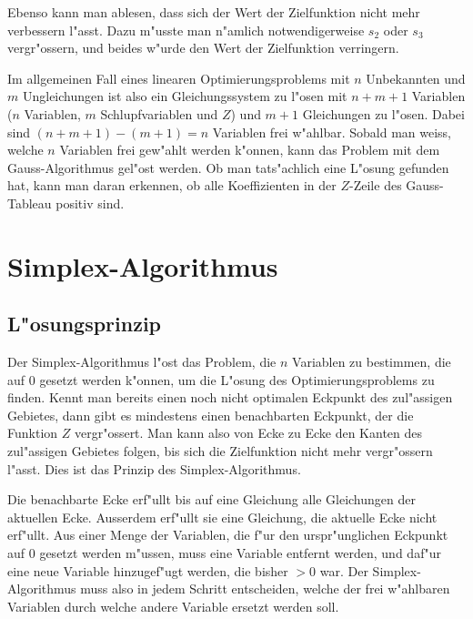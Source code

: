 Ebenso kann man ablesen, dass sich der Wert der Zielfunktion
nicht mehr verbessern l"asst.
Dazu m"usste man n"amlich notwendigerweise $s_2$ oder $s_3$
vergr"ossern, und beides w"urde den Wert der Zielfunktion verringern.

Im allgemeinen Fall eines linearen Optimierungsproblems mit $n$
Unbekannten und $m$ Ungleichungen ist also ein Gleichungssystem
zu l"osen mit $n+m+1$ Variablen ($n$ Variablen, $m$ Schlupfvariablen und
$Z$) und $m+1$ Gleichungen zu l"osen.
Dabei sind $(n+m+1)-(m+1)=n$ Variablen frei w"ahlbar.
Sobald man weiss, welche $n$ Variablen frei gew"ahlt werden k"onnen,
kann das Problem mit dem Gauss-Algorithmus gel"ost werden.
Ob man tats"achlich eine L"osung gefunden hat, kann man daran
erkennen, ob alle Koeffizienten in der $Z$-Zeile des Gauss-Tableau
positiv sind.

\section{Simplex-Algorithmus\label{lp:section:simplex}}
\subsection{L"osungsprinzip}
Der Simplex-Algorithmus l"ost das Problem, die $n$ Variablen
zu bestimmen, die auf $0$ gesetzt werden k"onnen, um die L"osung
des Optimierungsproblems zu finden.
Kennt man bereits einen noch nicht optimalen Eckpunkt des zul"assigen
Gebietes, dann gibt es mindestens einen benachbarten Eckpunkt,
der die Funktion $Z$ vergr"ossert.
Man kann also von Ecke zu Ecke den Kanten des zul"assigen
Gebietes folgen, bis sich die Zielfunktion nicht mehr vergr"ossern
l"asst. Dies ist das Prinzip des Simplex-Algorithmus.

Die benachbarte Ecke erf"ullt bis auf eine Gleichung alle
Gleichungen der aktuellen Ecke.
Ausserdem erf"ullt sie eine Gleichung, die aktuelle Ecke nicht
erf"ullt.
Aus einer Menge der Variablen, die f"ur den urspr"unglichen
Eckpunkt auf $0$ gesetzt werden m"ussen, muss eine Variable
entfernt werden, und daf"ur eine neue Variable hinzugef"ugt
werden, die bisher $>0$ war.
Der Simplex-Algorithmus muss also in jedem Schritt entscheiden,
welche der frei w"ahlbaren Variablen durch welche andere 
Variable ersetzt werden soll.

